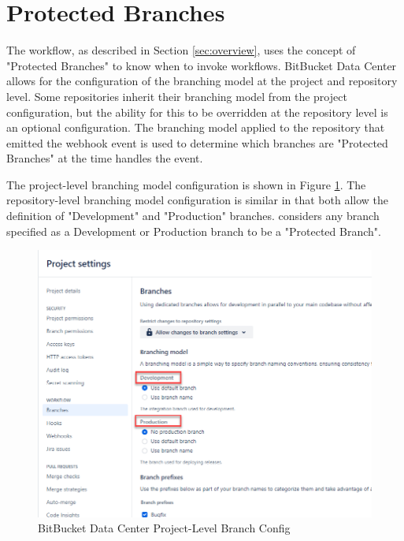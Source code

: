 \section{Protected Branches}

The \cxoneflow workflow, as described in Section \ref{sec:overview}, uses the concept of "Protected Branches"
to know when to invoke workflows.  BitBucket Data Center allows for the configuration of the branching model
at the project and repository level.  Some repositories inherit their branching model from the project
configuration, but the ability for this to be overridden at the repository level is an optional configuration.
The branching model applied to the repository that emitted the webhook event is used to determine which branches
are "Protected Branches" at the time \cxoneflow handles the event.

The project-level branching model configuration is shown in Figure \ref{fig:bbdc-branch-config}.  The
repository-level branching model configuration is similar in that both allow the definition of
"Development" and "Production" branches.  \cxoneflow considers any branch specified as a Development
or Production branch to be a "Protected Branch".

\begin{figure}[ht]
    \includegraphics[width=\textwidth]{graphics/bbdc-branch-config.png}
    \caption{BitBucket Data Center Project-Level Branch Config}
    \label{fig:bbdc-branch-config}
\end{figure}

